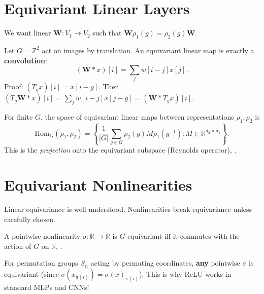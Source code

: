 \section{Equivariant Linear Layers}
\label{sec:eq:linear}

We want linear $\bm{W}: V_1 \to V_2$ such that $\bm{W} \rho_1(g) = \rho_2(g) \bm{W}$.

\begin{example}[Convolution = Translation Equivariance]
Let $G = \mathbb{Z}^2$ act on images by translation. An equivariant linear map is exactly a \textbf{convolution}: \cite{lim2023equivariant}
\[
(\bm{W} * x)[i] = \sum_j w[i-j] x[j].
\]
Proof: $(T_g x)[i] = x[i-g]$. Then $(T_g \bm{W} * x)[i] = \sum_j w[i-j] x[j-g] = (\bm{W} * T_g x)[i]$.
\end{example}

\begin{theorem}
For finite $G$, the space of equivariant linear maps between representations $\rho_1, \rho_2$ is \cite{lim2023equivariant}
\[
\mathrm{Hom}_G(\rho_1, \rho_2) = \left\{ \frac{1}{|G|} \sum_{g \in G} \rho_2(g) M \rho_1(g^{-1}) : M \in \mathbb{R}^{d_2 \times d_1} \right\}.
\]
This is the \emph{projection} onto the equivariant subspace (Reynolds operator), \cite{lim2023equivariant}.
\end{theorem}

\section{Equivariant Nonlinearities}
\label{sec:eq:nonlinear}

Linear equivariance is well understood. Nonlinearities break equivariance unless carefully chosen.

\begin{proposition}
A pointwise nonlinearity $\sigma: \mathbb{R} \to \mathbb{R}$ is $G$-equivariant iff it commutes with the action of $G$ on $\mathbb{R}$, \cite{lim2023equivariant}.
\end{proposition}

For permutation groups $S_n$ acting by permuting coordinates, \textbf{any} pointwise $\sigma$ is equivariant (since $\sigma(x_{\pi(i)}) = \sigma(x)_{\pi(i)}$). This is why ReLU works in standard MLPs and CNNs! \cite{lim2023equivariant}

